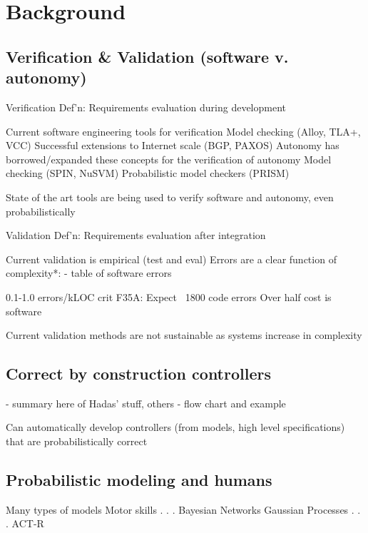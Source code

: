 
\section*{Background}

\subsection*{Verification \& Validation (software v. autonomy)}
Verification Def’n: Requirements evaluation during development

Current software engineering tools for verification
Model checking (Alloy, TLA+, VCC)
Successful extensions to Internet scale (BGP, PAXOS)
Autonomy has borrowed/expanded these concepts for the verification of autonomy
Model checking (SPIN, NuSVM)
Probabilistic model checkers (PRISM)

State of the art tools are being used to verify software and autonomy, even probabilistically 

Validation Def’n: Requirements evaluation after integration

Current validation is empirical (test and eval)
Errors are a clear function of complexity*: 
- table of software errors

0.1-1.0 errors/kLOC crit
F35A:
Expect ~1800 code errors
Over half cost is software

Current validation methods are not sustainable as systems increase in complexity





\subsection*{Correct by construction controllers}

- summary here of Hadas’ stuff, others
- flow chart and example



Can automatically develop  controllers (from models, high level specifications) that are probabilistically correct




\subsection*{Probabilistic modeling and humans}

Many types of models
Motor skills
     .
     .
     .
Bayesian Networks
Gaussian Processes
     .
     .
     .
ACT-R

